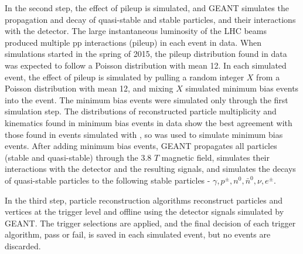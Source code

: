 
In the second step, the effect of pileup is simulated, and GEANT \cite{geant4} simulates the propagation and decay of quasi-stable and stable 
particles, and their interactions with the detector.  The large instantaneous luminosity of the LHC beams produced multiple pp interactions 
(pileup) in each event in data.  When \MC simulations started in the spring of 2015, the pileup distribution found in data was expected to 
follow a Poisson distribution with mean 12.  In each simulated event, the effect of pileup is simulated by pulling a 
random integer $X$ from a Poisson distribution with mean 12, and mixing $X$ simulated minimum bias events into the event.  The 
minimum bias events were simulated only through the first simulation step.  The distributions of reconstructed particle multiplicity and 
kinematics found in minimum bias events in data show the best agreement with those found in events simulated with \PYTHIA 
\cite{pythiaForHadronization}, so \PYTHIA was used to simulate minimum bias events.  After adding minimum bias events, GEANT propagates all 
particles (stable and quasi-stable) through the 3.8 $\unit{T}$ magnetic field, simulates their interactions with the detector and the resulting 
signals, and simulates the decays of quasi-stable particles to the following stable particles - $\gamma,p^{\pm},n^{0},\bar{n}^{0},\nu,e^{\pm}$.

In the third step, particle reconstruction algorithms reconstruct particles and vertices at the trigger level and offline using the detector 
signals simulated by GEANT.  The trigger selections are applied, and the final decision of each trigger algorithm, pass or fail, is saved in each 
simulated event, but no events are discarded.



